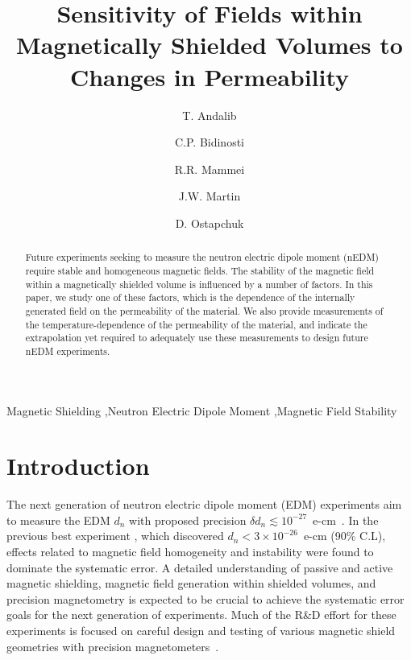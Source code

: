 \documentclass[review]{elsarticle}
\begin{document}
\begin{frontmatter}

\title{Sensitivity of Fields within Magnetically Shielded Volumes to
  Changes in Permeability}

\author[manitoba]{T. Andalib}
\author[winnipeg,manitoba]{C.P. Bidinosti}
\author[winnipeg,manitoba]{R.R. Mammei}
\author[winnipeg,manitoba]{J.W. Martin}
\author[winnipeg]{D. Ostapchuk}

\address[winnipeg]{Physics Department, The University of Winnipeg, 515 Portage Avenue, Winnipeg, MB, R3B 2E9, Canada}
\address[manitoba]{Department of Physics and Astronomy, University of Manitoba, Winnipeg, MB R3T 2N2, Canada}


\begin{abstract}
Future experiments seeking to measure the neutron electric dipole
moment (nEDM) require stable and homogeneous magnetic fields.  The
stability of the magnetic field within a magnetically shielded volume
is influenced by a number of factors.  In this paper, we study one of
these factors, which is the dependence of the internally generated
field on the permeability of the material.  We also provide
measurements of the temperature-dependence of the permeability of the
material, and indicate the extrapolation yet required to adequately
use these measurements to design future nEDM experiments.
\end{abstract}

\begin{keyword}
Magnetic Shielding \sep Neutron Electric Dipole Moment \sep Magnetic Field Stability
\end{keyword}

\end{frontmatter}

\linenumbers

\section{Introduction}

The next generation of neutron electric dipole moment (EDM)
experiments aim to measure the EDM $d_n$ with proposed precision
$\delta d_n\lesssim
10^{-27}$~e-cm~\cite{bib:nedm1,bib:nedm2,bib:nedm2.5,bib:nedm3,bib:nedm3.5,bib:nedm4,bib:nedm5,bib:nedm6,bib:nedm6.5}.
In the previous best experiment \cite{bib:pendlebury}, which discovered
$d_n<3\times 10^{-26}$~e-cm (90\% C.L), effects related to magnetic field
homogeneity and instability were found to dominate the systematic
error.  A detailed understanding of passive and active magnetic
shielding, magnetic field generation within shielded volumes, and
precision magnetometry is expected to be crucial to achieve the
systematic error goals for the next generation of experiments.  Much
of the R\&D effort for these experiments is focused on careful design
and testing of various magnetic shield geometries with precision
magnetometers~\cite{bib:brys,bib:afach,bib:fierlingerroom,bib:sturmthesis,bib:patton}.
\end{document}

